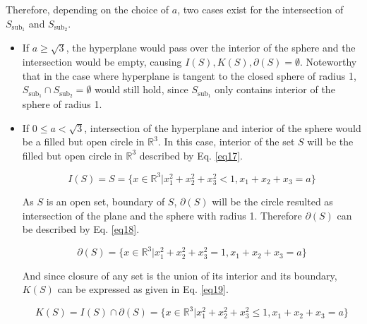 Therefore, depending on the choice of $a$, two cases exist for the intersection of $S_{\text{sub}_1}$ and $S_{\text{sub}_2}$.
\begin{itemize}\itemsep=0pt
\item[] If $a \geq \sqrt{3}$, the hyperplane would pass over the interior of the sphere and the intersection would be empty, causing $I(S), K(S), \partial(S) = \emptyset$.
Noteworthy that in the case where hyperplane is tangent to the closed sphere of radius 1, $S_{\text{sub}_1} \cap S_{\text{sub}_2} = \emptyset$ would still hold, since $S_{\text{sub}_1}$ only contains interior of the sphere of radius 1.
\item[] If $0 \leq a < \sqrt{3}$, intersection of the hyperplane and interior of the sphere would be a filled but open circle in $\mathbb{R}^3$.
In this case, interior of the set $S$ will be the filled but open circle in $\mathbb{R}^3$ described by Eq. \ref{eq17}.

\begin{equation}
I(S) = S = \{x \in \mathbb{R}^3 | x_1^2 + x_2^2 + x_3^2 < 1, x_1 + x_2 + x_3 = a\}
\label{eq17}
\end{equation}

As $S$ is an open set, boundary of $S$, $\partial(S)$ will be the circle resulted as intersection of the plane and the sphere with radius 1.
Therefore $\partial(S)$ can be described by Eq. \ref{eq18}.

\begin{equation}
\partial(S) = \{x \in \mathbb{R}^3 | x_1^2 + x_2^2 + x_3^2 = 1, x_1 + x_2 + x_3 = a\}
\label{eq18}
\end{equation}

And since closure of any set is the union of its interior and its boundary, $K(S)$ can be expressed as given in Eq. \ref{eq19}.

\begin{equation}
K(S) = I(S) \cap \partial(S) = \{x \in \mathbb{R}^3 | x_1^2 + x_2^2 + x_3^2 \leq 1, x_1 + x_2 + x_3 = a\}
\label{eq19}
\end{equation}

\end{itemize}
